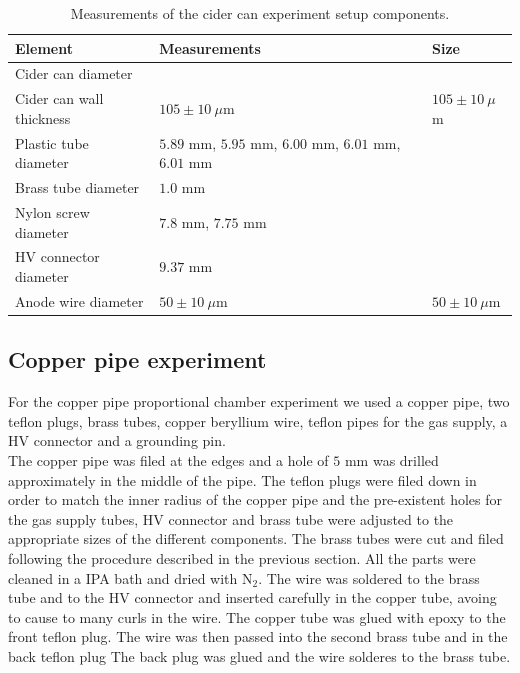 \begin{table}[]
	\begin{tabular}{l|l|l}
			Element                  & Measurements                                          & Size                \\ \hline
			Cider can diameter       &                                                       &                     \\
			Cider can wall thickness & $105 \pm 10 \ \mu$m                                   & $105 \pm 10 \ \mu$m \\
			Plastic tube diameter    & $5.89$ mm, $5.95$ mm, $6.00$ mm, $6.01$ mm, $6.01$ mm &                     \\
			Brass tube diameter      & $1.0$ mm                                              &                     \\
			Nylon screw diameter     & $7.8$ mm, $7.75$ mm                                   &                     \\
			HV connector diameter    & $9.37$ mm                                             &                     \\
			Anode wire diameter      & $50 \pm 10 \ \mu$m                                    & $50 \pm 10 \ \mu$m 
	\end{tabular}
\caption{Measurements of the cider can experiment setup components.}
\label{Tab:cidercan_sizes}
\end{table}



\subsection{Copper pipe experiment}
For the copper pipe proportional chamber experiment we used a copper pipe, two teflon plugs, brass tubes, copper beryllium wire, teflon pipes for the gas supply, a HV connector and a grounding pin. \\
The copper pipe was filed at the edges and a hole of $5$ mm was drilled approximately in the middle of the pipe. The teflon plugs were filed down in order to match the inner radius of the copper pipe and the pre-existent holes for the gas supply tubes, HV connector and brass tube were adjusted to the appropriate sizes of the different components. The brass tubes were cut and filed following the procedure described in the previous section. All the parts were cleaned in a IPA bath and dried with N$_2$. The wire was soldered to the brass tube and to the HV connector and inserted carefully in the copper tube, avoing to cause to many curls in the wire. The copper tube was glued with epoxy to the front teflon plug. The wire was then passed into the second brass tube and in the back teflon plug  The back plug was glued and the wire solderes to the brass tube.


